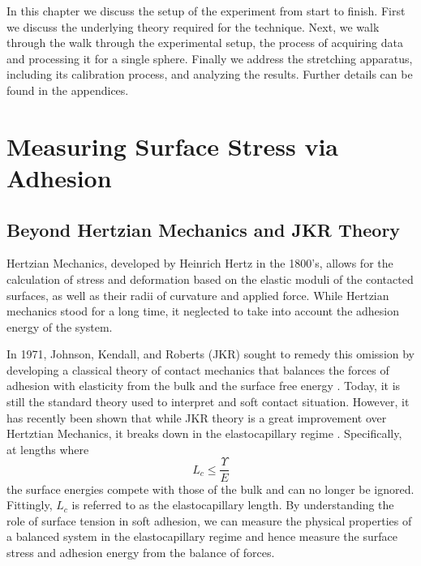 In this chapter we discuss the setup of the experiment from start to finish. First we discuss the underlying theory required for the technique. Next, we walk through the walk through the experimental setup, the process of acquiring data and processing it for a single sphere. Finally we address the stretching apparatus, including its calibration process, and analyzing the results. Further details can be found in the appendices.

\section{Measuring Surface Stress via Adhesion}
\subsection{Beyond Hertzian Mechanics and JKR Theory}

Hertzian Mechanics, developed by Heinrich Hertz in the 1800's, allows for the calculation of stress and deformation based on the elastic moduli of the contacted surfaces, as well as their radii of curvature and applied force. While Hertzian mechanics stood for a long time, it neglected to take into account the adhesion energy of the system.  

In 1971, Johnson, Kendall, and Roberts (JKR) sought to remedy this omission by developing a classical theory of contact mechanics that balances the forces of adhesion with elasticity from the bulk and the surface free energy {\cite{johnson1971surface}}. Today, it is still the standard theory used to interpret and soft contact situation. However, it has recently been shown that while JKR theory is a great improvement over Hertztian Mechanics, it breaks down in the elastocapillary regime \cite{style2013surface}. Specifically, at lengths where 
\begin{equation}
\label{EC_regime}
L_{c} \leq \frac{\Upsilon}{E}
\end{equation}
the surface energies compete with those of the bulk and can no longer be ignored. Fittingly, $L_c$ is referred to as the elastocapillary length. By understanding the role of surface tension in soft adhesion, we can measure the physical properties of a balanced system in the elastocapillary regime and hence measure the surface stress and adhesion energy from the balance of forces.



